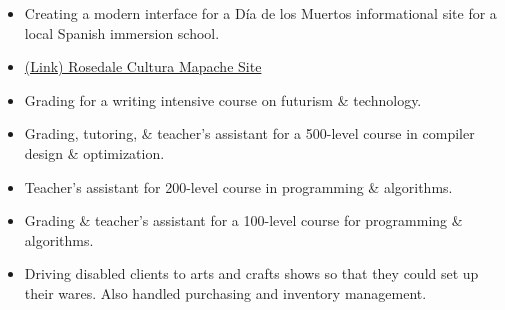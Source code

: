 \documentclass[10pt,a4paper,ragged2e,withhyper]{altacv}
\begin{document}
\begin{paracol}{2}
\begin{itemize}
          \item Creating a modern interface for a Día de los Muertos informational site for a local Spanish immersion school.
          \item \href{https://www.culturamapache.com}{(Link) Rosedale Cultura Mapache Site}
      \end{itemize}
      \divider
      \begin{itemize}
        \item Grading for a writing intensive course on futurism \& technology.
        \item Grading, tutoring, \& teacher's assistant for a 500-level course in compiler design \& optimization.
        \item Teacher's assistant for 200-level course in programming \& algorithms.
        \item Grading \& teacher's assistant for a 100-level course for programming \& algorithms.
      \end{itemize}

      \divider

      \begin{itemize}
        \item Driving disabled clients to arts and crafts shows so that they could set up their wares. Also handled purchasing and inventory management.
      \end{itemize}


      \switchcolumn

      \color{01black}
      \newline
      \newline
      \newline
      \newline
      \newline
      \newline
      \newline


\end{paracol}
\end{document}
